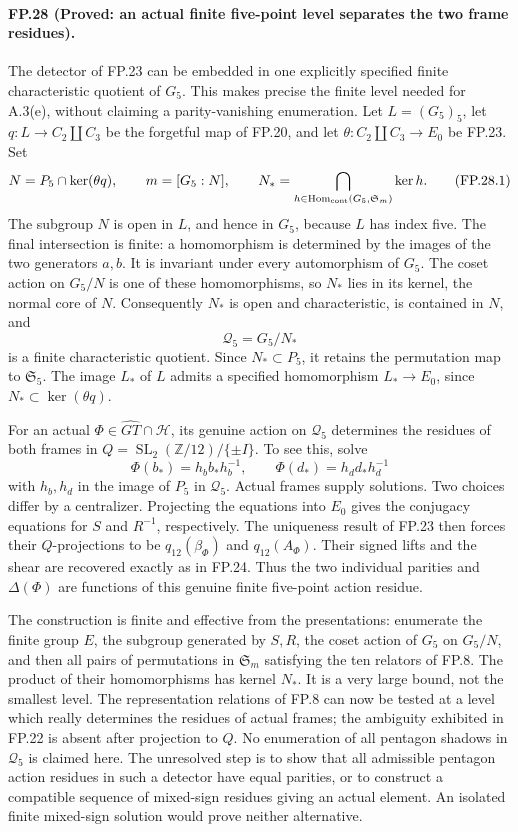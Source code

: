 \paragraph{FP.28 (Proved: an actual finite five-point level separates the two frame residues).}
The detector of FP.23 can be embedded in one explicitly specified finite
characteristic quotient of $G_5$. This makes precise the finite level
needed for A.3(e), without claiming a parity-vanishing enumeration.
Let $L=(G_5)_5$, let $q:L\to C_2\amalg C_3$ be the forgetful map
of FP.20, and let $\theta:C_2\amalg C_3\to E_0$ be FP.23.
Set
\[
 N=P_5\cap\ker(\theta q),\qquad m=[G_5:N],\qquad
 N_*=\bigcap_{h\in\operatorname{Hom}_{\rm cont}
                         (G_5,\mathfrak S_m)}\ker h.
 \tag{FP.28.1}
\]
The subgroup $N$ is open in $L$, and hence in $G_5$, because $L$
has index five. The final intersection is finite: a homomorphism is
determined by the images of the two generators $a,b$. It is invariant
under every automorphism of $G_5$. The coset action on $G_5/N$ is one
of these homomorphisms, so $N_*$ lies in its kernel, the normal core
of $N$. Consequently $N_*$ is open and characteristic, is contained
in $N$, and
\[
 \mathcal Q_5=G_5/N_*
\]
is a finite characteristic quotient. Since $N_*\subset P_5$, it
retains the permutation map to $\mathfrak S_5$. The image $L_*$ of
$L$ admits a specified homomorphism $L_*\to E_0$, since
$N_*\subset\ker(\theta q)$.

For an actual $\Phi\in\widehat{GT}\cap\mathcal H$, its genuine
action on $\mathcal Q_5$ determines the residues of both frames in
$Q=\operatorname{SL}_2(\mathbb Z/12)/\{\pm I\}$.
To see this, solve
\[
 \Phi(b_*)=h_b b_*h_b^{-1},\qquad
 \Phi(d_*)=h_d d_*h_d^{-1}
 \tag{FP.28.2}
\]
with $h_b,h_d$ in the image of $P_5$ in $\mathcal Q_5$.
Actual frames supply solutions. Two choices differ by a centralizer.
Projecting the equations into $E_0$ gives the conjugacy equations
for $S$ and $R^{-1}$, respectively. The uniqueness result of FP.23
then forces their $Q$-projections to be
$q_{12}(\beta_\Phi)$ and $q_{12}(A_\Phi)$. Their signed lifts and
the shear are recovered exactly as in FP.24. Thus the two individual
parities and $\Delta(\Phi)$ are functions of this genuine finite
five-point action residue.

The construction is finite and effective from the presentations:
enumerate the finite group $E$, the subgroup generated by $S,R$,
the coset action of $G_5$ on $G_5/N$, and then all pairs of
permutations in $\mathfrak S_m$ satisfying the ten relators of FP.8.
The product of their homomorphisms has kernel $N_*$.
It is a very large bound, not the smallest level. The representation
relations of FP.8 can now be tested at a level which really determines
the residues of actual frames; the ambiguity exhibited in FP.22 is
absent after projection to $Q$. No enumeration of all pentagon shadows
in $\mathcal Q_5$ is claimed here. The unresolved step is to show
that all admissible pentagon action residues in such a detector have
equal parities, or to construct a compatible sequence of mixed-sign
residues giving an actual element. An isolated finite mixed-sign
solution would prove neither alternative.


